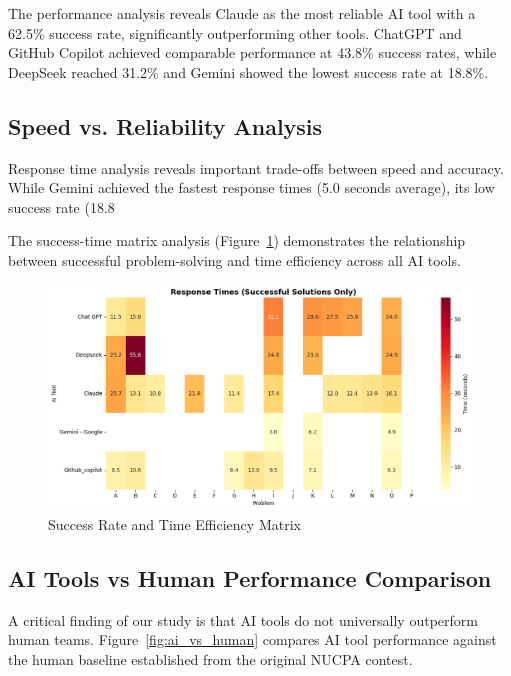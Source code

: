 \documentclass[conference]{IEEEtran}
\begin{document}
The performance analysis reveals Claude as the most reliable AI tool with a 62.5\% success rate, significantly outperforming other tools. ChatGPT and GitHub Copilot achieved comparable performance at 43.8\% success rates, while DeepSeek reached 31.2\% and Gemini showed the lowest success rate at 18.8\%.

\subsection{Speed vs. Reliability Analysis}

Response time analysis reveals important trade-offs between speed and accuracy. While Gemini achieved the fastest response times (5.0 seconds average), its low success rate (18.8%

The success-time matrix analysis (Figure~\ref{fig:success_time_matrix}) demonstrates the relationship between successful problem-solving and time efficiency across all AI tools.

\begin{figure}[htbp]
\centering
\includegraphics[width=0.85\linewidth]{images/ai_tools_images_updated/succsess_time_matrix.png}
\caption{Success Rate and Time Efficiency Matrix}
\label{fig:success_time_matrix}
\end{figure}

\subsection{AI Tools vs Human Performance Comparison}

A critical finding of our study is that AI tools do not universally outperform human teams. Figure~\ref{fig:ai_vs_human} compares AI tool performance against the human baseline established from the original NUCPA contest.
\end{document}
